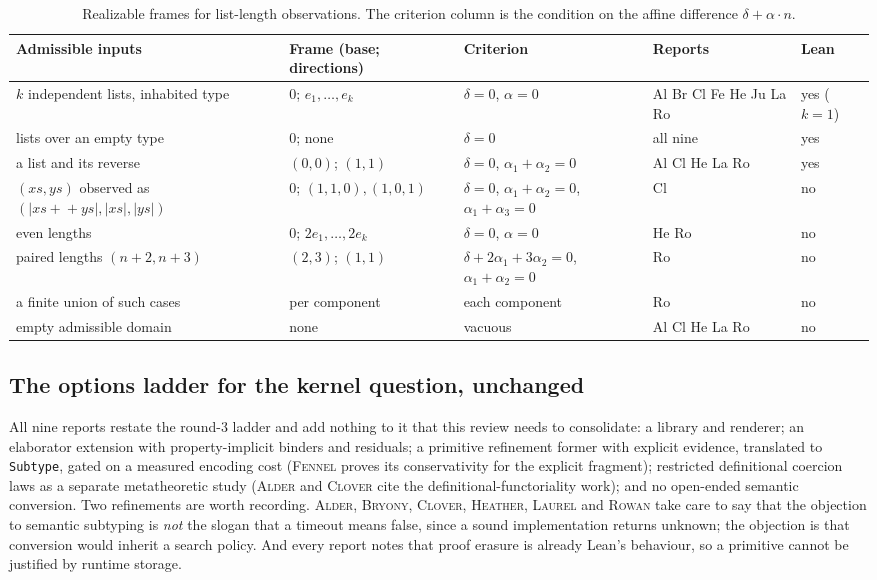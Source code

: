 \documentclass[11pt,a4paper]{article}
\newcommand{\code}[1]{\nolinkurl{#1}}
\newcommand{\Al}{\textsc{Alder}}
\newcommand{\Br}{\textsc{Bryony}}
\newcommand{\Cl}{\textsc{Clover}}
\newcommand{\Fe}{\textsc{Fennel}}
\newcommand{\He}{\textsc{Heather}}
\newcommand{\La}{\textsc{Laurel}}
\newcommand{\Ro}{\textsc{Rowan}}
\theoremstyle{definition}
\theoremstyle{plain}
\begin{document}
\begin{table}[htbp]\small
\caption{Realizable frames for list-length observations. The criterion column is the condition on the affine difference $\delta+\alpha\cdot n$.}\label{tab:frames}
\begin{tabularx}{\textwidth}{@{}L{34mm}L{30mm}L{34mm}L{26mm}l@{}}
\toprule
Admissible inputs & Frame (base; directions) & Criterion & Reports & Lean\\\midrule
$k$ independent lists, inhabited type & $0$; $e_1,\ldots,e_k$ & $\delta=0$, $\alpha=0$ & Al Br Cl Fe He Ju La Ro & yes ($k=1$)\\
lists over an empty type & $0$; none & $\delta=0$ & all nine & yes\\
a list and its reverse & $(0,0)$; $(1,1)$ & $\delta=0$, $\alpha_1+\alpha_2=0$ & Al Cl He La Ro & yes\\
$(xs,ys)$ observed as $(|xs\!+\!\!+ys|,|xs|,|ys|)$ & $0$; $(1,1,0),(1,0,1)$ & $\delta=0$, $\alpha_1+\alpha_2=0$, $\alpha_1+\alpha_3=0$ & Cl & no\\
even lengths & $0$; $2e_1,\ldots,2e_k$ & $\delta=0$, $\alpha=0$ & He Ro & no\\
paired lengths $(n+2,n+3)$ & $(2,3)$; $(1,1)$ & $\delta+2\alpha_1+3\alpha_2=0$, $\alpha_1+\alpha_2=0$ & Ro & no\\
a finite union of such cases & per component & each component & Ro & no\\
empty admissible domain & none & vacuous & Al Cl He La Ro & no\\
\bottomrule
\end{tabularx}
\end{table}

\subsection{The options ladder for the kernel question, unchanged}\label{sec:ladder}
All nine reports restate the round-3 ladder and add nothing to it that this review needs to consolidate: a library and renderer; an elaborator extension with property-implicit binders and residuals; a primitive refinement former with explicit evidence, translated to \code{Subtype}, gated on a measured encoding cost (\Fe{} proves its conservativity for the explicit fragment); restricted definitional coercion laws as a separate metatheoretic study (\Al{} and \Cl{} cite the definitional-functoriality work); and no open-ended semantic conversion. Two refinements are worth recording. \Al, \Br, \Cl, \He, \La{} and \Ro{} take care to say that the objection to semantic subtyping is \emph{not} the slogan that a timeout means false, since a sound implementation returns unknown; the objection is that conversion would inherit a search policy. And every report notes that proof erasure is already Lean's behaviour, so a primitive cannot be justified by runtime storage.
\end{document}
